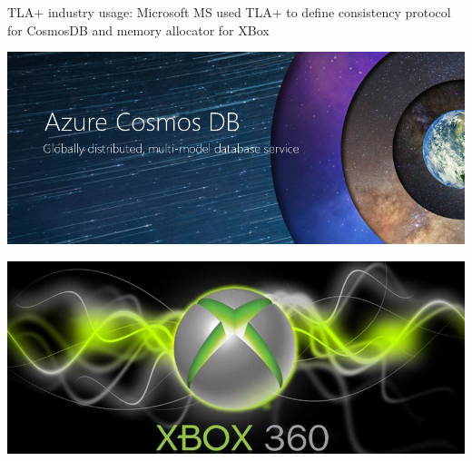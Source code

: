 \documentclass[12pt]{beamer}
\begin{document}
  \begin{frame}{TLA+ industry usage: Microsoft}
      MS used TLA+ to define consistency protocol for CosmosDB and memory
      allocator for XBox \cite{ms2017}
    \begin{center}
        \includegraphics[scale=0.2]{figures/cosmos}
    \end{center}
    \begin{center}
        \includegraphics[scale=0.2]{figures/xbox}
    \end{center}
  \end{frame}
\end{document}
